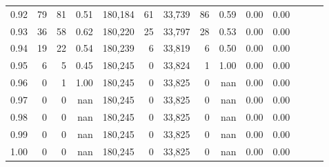 \begin{tabular}{rrrrrrrrrrrrrr}
0.92 &     79 &   81 &  0.51 &  180,184 &       61 &  33,739 &      86 &  0.59 &  0.00 &      0.00 \\
0.93 &     36 &   58 &  0.62 &  180,220 &       25 &  33,797 &      28 &  0.53 &  0.00 &      0.00 \\
0.94 &     19 &   22 &  0.54 &  180,239 &        6 &  33,819 &       6 &  0.50 &  0.00 &      0.00 \\
0.95 &      6 &    5 &  0.45 &  180,245 &        0 &  33,824 &       1 &  1.00 &  0.00 &      0.00 \\
0.96 &      0 &    1 &  1.00 &  180,245 &        0 &  33,825 &       0 &   nan &  0.00 &      0.00 \\
0.97 &      0 &    0 &   nan &  180,245 &        0 &  33,825 &       0 &   nan &  0.00 &      0.00 \\
0.98 &      0 &    0 &   nan &  180,245 &        0 &  33,825 &       0 &   nan &  0.00 &      0.00 \\
0.99 &      0 &    0 &   nan &  180,245 &        0 &  33,825 &       0 &   nan &  0.00 &      0.00 \\
1.00 &      0 &    0 &   nan &  180,245 &        0 &  33,825 &       0 &   nan &  0.00 &      0.00 \\
\bottomrule
\end{tabular}
